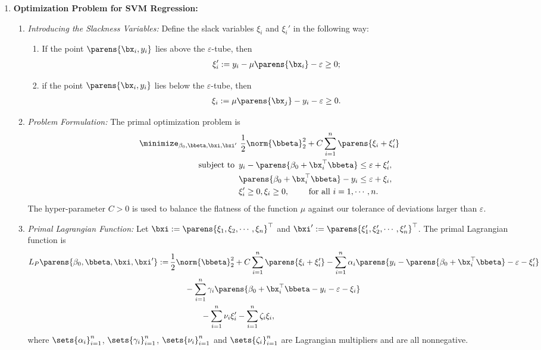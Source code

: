 \documentclass[12pt]{article}
\begin{document}
\begin{enumerate}[label=\textbf{\arabic*.}]
	\item \textbf{Optimization Problem for SVM Regression:} 
	\begin{enumerate}
		\item \textit{Introducing the Slackness Variables:} Define the slack variables $\xi_i$ and $\xi_i'$ in the following way: 
		\begin{enumerate}
			\item If the point $\parens{\bx_i, y_i}$ lies above the $\varepsilon$-tube, then 
			\begin{align*}
				\xi_i' := y_i - \mu \parens{\bx_i} - \varepsilon \ge 0; 
			\end{align*}
			\item if the point $\parens{\bx_i, y_i}$ lies below the $\varepsilon$-tube, then 
			\begin{align*}
				\xi_i := \mu \parens{\bx_j} - y_i - \varepsilon \ge 0. 
			\end{align*}
		\end{enumerate}
		
		\item \textit{Problem Formulation:} The primal optimization problem is 
		\begin{equation}\label{eq-svm-reg}
			\begin{aligned}
				\minimize_{\beta_0, \bbeta, \bxi, \bxi'} & \ \frac{1}{2} \norm{\bbeta}_2^2 + C \sum_{i=1}^n \parens{\xi_i + \xi_i'} \\ 
				\text{subject to } & \, y_i - \parens{\beta_0 + \bx_i^\top \bbeta} \le \varepsilon + \xi_i', \\ 
				& \, \parens{\beta_0 + \bx_i^\top \bbeta} - y_i \le \varepsilon + \xi_i, \\ 
				& \, \xi_i' \ge 0, \xi_i \ge 0, \qquad \text{ for all } i = 1, \cdots, n. 
			\end{aligned}
		\end{equation}
		The hyper-parameter $C > 0$ is used to balance the flatness of the function $\mu$ against our tolerance of deviations larger than $\varepsilon$.  
		
		\item \textit{Primal Lagrangian Function:} Let $\bxi := \parens{\xi_1, \xi_2, \cdots, \xi_n}^\top$ and $\bxi' := \parens{\xi_1', \xi_2', \cdots, \xi_n'}^\top$. The primal Lagrangian function is 
		\begin{align*}
			L_P \parens{\beta_0, \bbeta, \bxi, \bxi'} := & \, \frac{1}{2} \norm{\bbeta}_2^2 + C \sum_{i=1}^n \parens{\xi_i + \xi_i'} - \sum_{i=1}^n \alpha_i \parens{ y_i - \parens{\beta_0 + \bx_i^\top \bbeta} - \varepsilon - \xi_i'} \\ 
				& \qquad - \sum_{i=1}^n \gamma_i \parens{\beta_0 + \bx_i^\top \bbeta - y_i - \varepsilon - \xi_i} \\ 
				& \qquad \qquad - \sum_{i=1}^n \nu_i \xi_i' - \sum_{i=1}^n \zeta_i \xi_i, 
		\end{align*}
		where $\sets{\alpha_i}_{i=1}^n$, $\sets{\gamma_i}_{i=1}^n$, $\sets{\nu_i}_{i=1}^n$ and $\sets{\zeta_i}_{i=1}^n$ are Lagrangian multipliers and are all nonnegative. 
		

\end{enumerate}
\end{enumerate}
\end{document}
